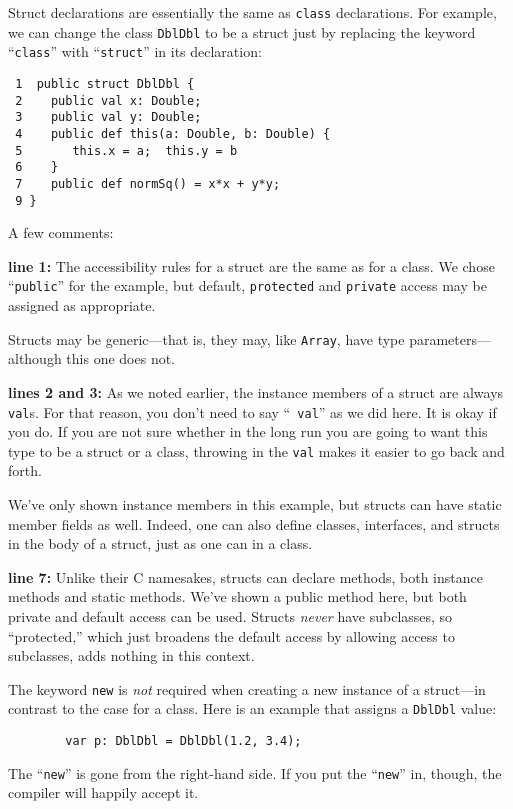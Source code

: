 Struct declarations are essentially the same as {\tt class} declarations.
For example, we can
change the class {\tt DblDbl} to be a struct just by replacing the keyword
``{\tt class}'' with ``{\tt struct}'' in its declaration:
\begin{verbatim}
 1  public struct DblDbl {
 2    public val x: Double;
 3    public val y: Double;
 4    public def this(a: Double, b: Double) {
 5       this.x = a;  this.y = b
 6    }
 7    public def normSq() = x*x + y*y;
 9 }
\end{verbatim}
A few comments:
\begin{description}
\item{\bf line 1:} The accessibility rules for a struct are the same as for a
class.  We chose ``{\tt public}'' for the example, but default, {\tt protected} 
and {\tt private} access may be assigned as appropriate.

Structs may be generic---that is, they may, like {\tt Array}, have type
parameters---although this one does not.

\item{\bf lines 2 and 3:}  As we noted earlier, the instance members of a struct
are always {\tt val}s. For that reason, you don't need to say ``{\tt
val}'' as we did here.  It is okay if you do. If you are not sure whether in
the long run you are going to want this type to be a struct or a class,
throwing in the {\tt val} makes it easier to go back and forth.

We've only shown instance members in this example, but
structs can have static member fields as well.
Indeed, one can also define classes, interfaces, and structs in the
body of a struct, just as one can in a class.
\item 
 
\item{\bf line 7:} Unlike their C namesakes, \Xten{} structs can declare
methods, both instance methods and static methods. We've shown a public
method here, but both private and default access can be used. Structs
{\em never} have subclasses, so ``protected,'' which just broadens the default
access by allowing access to subclasses, adds nothing in this context.
\end{description}

The keyword {\tt new} is {\em not} required when creating
 a new instance of a struct---in contrast to the case for a class.
Here is an example that assigns a {\tt DblDbl} value:
\begin{verbatim}
        var p: DblDbl = DblDbl(1.2, 3.4);
\end{verbatim}
The ``{\tt new}'' is gone from the right-hand side.
If you put the ``{\tt new}'' in, though, the compiler will happily accept it.

